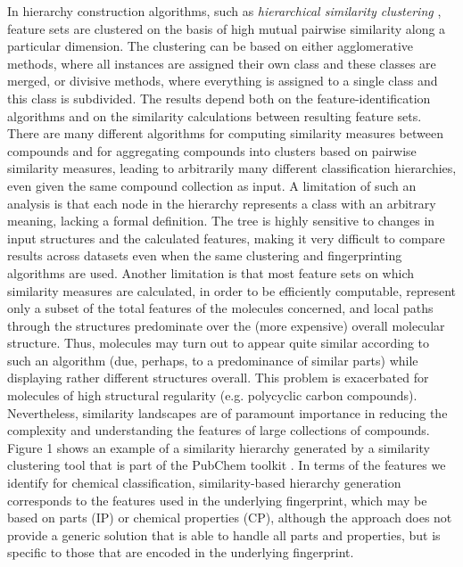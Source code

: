 \documentclass[10pt]{bmc_article}
\newenvironment{bmcformat}{\baselineskip20pt\sloppy\setboolean{publ}{false}}{\baselineskip20pt\sloppy}
\begin{document}
\begin{bmcformat}
In hierarchy construction algorithms, such as \textit{hierarchical similarity clustering} \cite{Adamson1981,barnard1992}, feature sets are clustered on the basis of high mutual pairwise similarity along a particular dimension.  The clustering can be based on either agglomerative methods, where all instances are assigned their own class and these classes are merged, or divisive methods, where everything is assigned to a single class and this class is subdivided. The results depend both on the feature-identification algorithms and on the similarity calculations between resulting feature sets. There are many different algorithms for computing similarity measures between compounds and for aggregating compounds into clusters based on pairwise similarity measures, leading to arbitrarily many different classification hierarchies, even given the same compound collection as input.  A limitation of such an analysis is that each node in the hierarchy represents a class with an arbitrary meaning, lacking a formal definition.  The tree is highly sensitive to changes in input structures and the calculated features, making it very difficult to compare results across datasets even when the same clustering and fingerprinting algorithms are used. Another limitation is that most feature sets on which similarity measures are calculated, in order to be efficiently computable, represent only a subset of the total features of the molecules concerned, and local paths through the structures predominate over the (more expensive) overall molecular structure. Thus, molecules may turn out to appear quite similar according to such an algorithm (due, perhaps, to a predominance of similar parts) while displaying rather different structures overall.  This problem is exacerbated for molecules of high structural regularity (e.g. polycyclic carbon compounds).  Nevertheless, similarity landscapes are of paramount importance in reducing the complexity and understanding the features of large collections of compounds.
Figure 1 shows an example of a similarity hierarchy generated by a similarity clustering tool that is part of the PubChem toolkit \cite{bolton2008}. 
In terms of the features we identify for chemical classification, similarity-based hierarchy generation corresponds to the features used in the underlying fingerprint, which may be based on parts (IP) or chemical properties (CP), although the approach does not provide a generic solution that is able to handle all parts and properties, but is specific to those that are encoded in the underlying fingerprint. 


\end{bmcformat}
\end{document}
